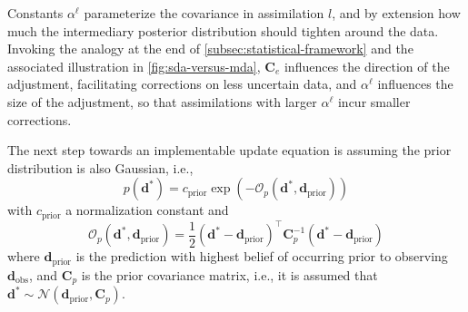 Constants $\alpha^\ell$ parameterize the covariance in assimilation $l$,
and by extension how much the intermediary posterior distribution should tighten around the data.
%
Invoking the analogy at the end of \cref{subsec:statistical-framework} 
and the associated illustration in \cref{fig:sda-versus-mda}, 
$\mathbf{C}_e$ influences the direction of the adjustment,
facilitating corrections on less uncertain data,
and $\alpha^\ell$ influences the size of the adjustment, 
so that assimilations with larger $\alpha^\ell$ incur smaller corrections.  

The next step towards an implementable update equation is assuming the prior distribution is also Gaussian, i.e.,
%
\begin{equation}
    p(\mathbf{d}^*) = c_\text{prior} \exp(-\mathcal{O}_p(\mathbf{d}^*, \mathbf{d}_\text{prior}))
\label{eq:prior}
\end{equation}
%
with $c_\text{prior}$ a normalization constant and
%
\begin{equation}
    \mathcal{O}_p(\mathbf{d}^*, \mathbf{d}_\text{prior}) = 
    \frac{1}{2}
    (\mathbf{d}^* - \mathbf{d}_\text{prior})^\top 
    \mathbf{C}_p^{-1}
    (\mathbf{d}^* - \mathbf{d}_\text{prior})
\end{equation}
%
where $\mathbf{d}_\text{prior}$ is the prediction with highest belief of occurring prior to observing $\mathbf{d}_\text{obs}$,
and $\mathbf{C}_p$ is the prior covariance matrix, i.e., it is assumed that 
$\mathbf{d}^* \sim \mathcal{N}(\mathbf{d}_\text{prior}, \mathbf{C}_p)$.

